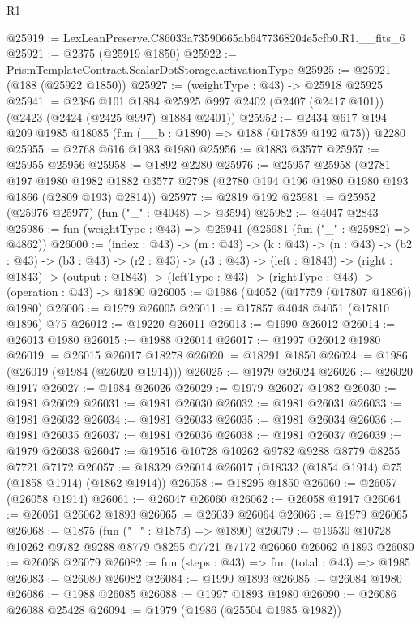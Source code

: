 \begin{lexlean}{R1}
\begin{coremodule}
@25919 := LexLeanPreserve.C86033a73590665ab6477368204e5cfb0.R1.__fits_6
@25921 := @2375 (@25919 @1850)
@25922 := PrismTemplateContract.ScalarDotStorage.activationType
@25925 := @25921 (@188 (@25922 @1850))
@25927 := (weightType : @43) -> @25918 @25925
@25941 := @2386
    @101
    @1884
    @25925
    @997
    @2402
    (@2407 (@2417 @101))
    (@2423 (@2424 (@2425 @997) @1884 @2401))
@25952 := @2434 @617 @194 @209 @1985 @18085 (fun (__b : @1890) => @188 (@17859 @192 @75)) @2280
@25955 := @2768 @616 @1983 @1980
@25956 := @1883 @3577
@25957 := @25955 @25956
@25958 := @1892 @2280
@25976 := @25957
    @25958
    (@2781
      @197
      @1980
      @1982
      @1882
      @3577
      @2798
      (@2780 @194 @196 @1980 @1980 @193 @1866 (@2809 @193) @2814))
@25977 := @2819 @192
@25981 := @25952 (@25976 @25977) (fun ("_" : @4048) => @3594)
@25982 := @4047 @2843
@25986 := fun (weightType : @43) => @25941 (@25981 (fun ("_" : @25982) => @4862))
@26000 := (index : @43) ->
  (m : @43) ->
  (k : @43) ->
  (n : @43) ->
  (b2 : @43) ->
  (b3 : @43) ->
  (r2 : @43) ->
  (r3 : @43) ->
  (left : @1843) ->
  (right : @1843) ->
  (output : @1843) -> (leftType : @43) -> (rightType : @43) -> (operation : @43) -> @1890
@26005 := @1986 (@4052 (@17759 (@17807 @1896)) @1980)
@26006 := @1979 @26005
@26011 := @17857 @4048 @4051 (@17810 @1896) @75
@26012 := @19220 @26011
@26013 := @1990 @26012
@26014 := @26013 @1980
@26015 := @1988 @26014
@26017 := @1997 @26012 @1980
@26019 := @26015 @26017 @18278
@26020 := @18291 @1850
@26024 := @1986 (@26019 (@1984 (@26020 @1914)))
@26025 := @1979 @26024
@26026 := @26020 @1917
@26027 := @1984 @26026
@26029 := @1979 @26027 @1982
@26030 := @1981 @26029
@26031 := @1981 @26030
@26032 := @1981 @26031
@26033 := @1981 @26032
@26034 := @1981 @26033
@26035 := @1981 @26034
@26036 := @1981 @26035
@26037 := @1981 @26036
@26038 := @1981 @26037
@26039 := @1979 @26038
@26047 := @19516 @10728 @10262 @9782 @9288 @8779 @8255 @7721 @7172
@26057 := @18329 @26014 @26017 (@18332 (@1854 @1914) @75 (@1858 @1914) (@1862 @1914))
@26058 := @18295 @1850
@26060 := @26057 (@26058 @1914)
@26061 := @26047 @26060
@26062 := @26058 @1917
@26064 := @26061 @26062 @1893
@26065 := @26039 @26064
@26066 := @1979 @26065
@26068 := @1875 (fun ("_" : @1873) => @1890)
@26079 := @19530 @10728 @10262 @9782 @9288 @8779 @8255 @7721 @7172 @26060 @26062 @1893
@26080 := @26068 @26079
@26082 := fun (steps : @43) => fun (total : @43) => @1985
@26083 := @26080 @26082
@26084 := @1990 @1893
@26085 := @26084 @1980
@26086 := @1988 @26085
@26088 := @1997 @1893 @1980
@26090 := @26086 @26088 @25428
@26094 := @1979 (@1986 (@25504 @1985 @1982))

\end{coremodule}
\end{lexlean}
